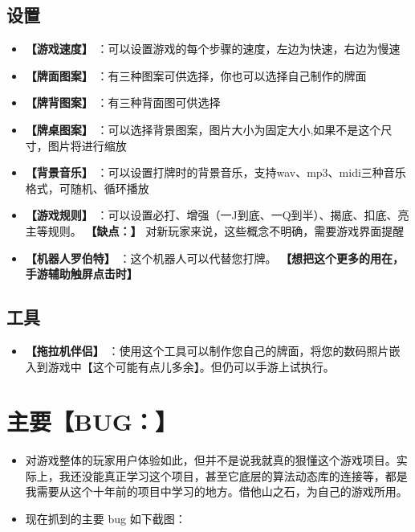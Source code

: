 \documentclass[9pt, b5paper]{article}
\begin{document}
\subsection{设置}
\label{sec-3-2}
\begin{itemize}
\item \textbf{【游戏速度】} ：可以设置游戏的每个步骤的速度，左边为快速，右边为慢速
\item \textbf{【牌面图案】} ：有三种图案可供选择，你也可以选择自己制作的牌面
\item \textbf{【牌背图案】} ：有三种背面图可供选择
\item \textbf{【牌桌图案】} ：可以选择背景图案，图片大小为固定大小,如果不是这个尺寸，图片将进行缩放
\item \textbf{【背景音乐】} ：可以设置打牌时的背景音乐，支持wav、mp3、midi三种音乐格式，可随机、循环播放
\item \textbf{【游戏规则】} ：可以设置必打、增强（一J到底、一Q到半）、揭底、扣底、亮主等规则。 \textbf{【缺点：】} 对新玩家来说，这些概念不明确，需要游戏界面提醒
\item \textbf{【机器人罗伯特】} ：这个机器人可以代替您打牌。 \textbf{【想把这个更多的用在，手游辅助触屏点击时】}
\end{itemize}
\subsection{工具}
\label{sec-3-3}
\begin{itemize}
\item \textbf{【拖拉机伴侣】} ：使用这个工具可以制作您自己的牌面，将您的数码照片嵌入到游戏中【这个可能有点儿多余】。但仍可以手游上试执行。
\end{itemize}
\section{主要【BUG：】}
\label{sec-4}
\begin{itemize}
\item 对游戏整体的玩家用户体验如此，但并不是说我就真的狠懂这个游戏项目。实际上，我还没能真正学习这个项目，甚至它底层的算法动态库的连接等，都是我需要从这个十年前的项目中学习的地方。借他山之石，为自己的游戏所用。
\item 现在抓到的主要 bug 如下截图：
\end{itemize}
\end{document}
